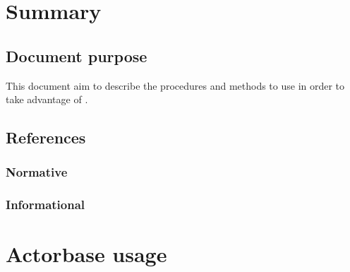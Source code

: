 \documentclass{scalatekids-article}
\begin{document}
\section{Summary}
\subsection{Document purpose}
This document aim to describe the procedures and methods to use in order to take advantage of .

\subsection{References}

\subsubsection{Normative} %

\subsubsection{Informational} %









\section{Actorbase usage}
\end{document}

